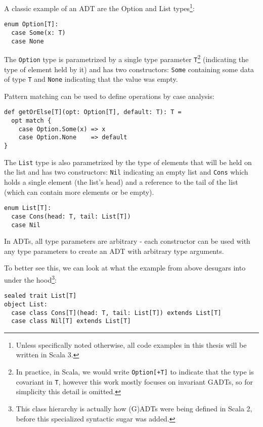 A classic example of an ADT are the Option and List types\footnote{Unless specifically noted otherwise, all code examples in this thesis will be written in Scala 3.}:

\begin{lstlisting}[style=scala]
enum Option[T]:
  case Some(x: T)
  case None
\end{lstlisting}

The \texttt{Option} type is parametrized by a single type parameter \texttt{T}\footnote{In practice, in Scala, we would write \texttt{Option[+T]} to indicate that the type is covariant in \texttt{T}, however this work mostly focuses on invariant GADTs, so for simplicity this detail is omitted.} (indicating the type of element held by it) and has two constructors: \texttt{Some} containing some data of type \texttt{T} and \texttt{None} indicating that the value was empty.

Pattern matching can be used to define operations by case analysis:

\begin{lstlisting}[style=scala]
def getOrElse[T](opt: Option[T], default: T): T =
  opt match {
    case Option.Some(x) => x
    case Option.None    => default
}
\end{lstlisting}

The \texttt{List} type is also parametrized by the type of elements that will be held on the list and has two constructors: \texttt{Nil} indicating an empty list and \texttt{Cons} which holds a single element (the list's head) and a reference to the tail of the list (which can contain more elements or be empty).

\begin{lstlisting}[style=scala]
enum List[T]:
  case Cons(head: T, tail: List[T])
  case Nil
\end{lstlisting}

In ADTs, all type parameters are arbitrary - each constructor can be used with any type parameters to create an ADT with arbitrary type arguments.

To better see this, we can look at what the example from above desugars into under the hood\footnote{This class hierarchy is actually how (G)ADTs were being defined in Scala 2, before this specialized syntactic sugar was added. 
  

}:

\begin{lstlisting}[style=scala]
sealed trait List[T]
object List:
  case class Cons[T](head: T, tail: List[T]) extends List[T]
  case class Nil[T] extends List[T]
\end{lstlisting}

